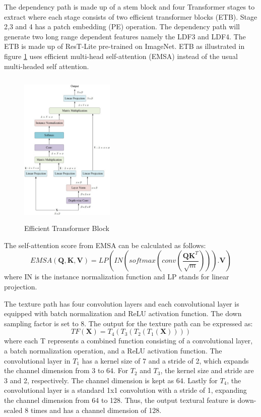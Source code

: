 The dependency path is made up of a stem block and four Transformer stages to extract where each stage consists of two efficient transformer blocks (ETB). Stage 2,3 and 4 has a patch embedding (PE) operation. The dependency path will generate two long range dependent features namely the LDF3 and LDF4. The ETB is made up of ResT-Lite \cite{restlite} pre-trained on ImageNet. ETB as illustrated in figure \ref{fig:etb} uses efficient multi-head self-attention (EMSA) instead of the usual multi-headed self attention.

\FloatBarrier
\begin{figure}[ht]
\includegraphics[width=4.5cm, height=7.5cm]{images/etb.png}
\centering
\caption{Efficient Transformer Block \protect\cite{banet}}
\label{fig:etb}
\end{figure}

The self-attention score from EMSA can be calculated as follows:
\begin{equation}
    EMSA(\mathbf{Q,K,V}) = LP(IN(softmax(conv(\frac{\mathbf{QK}^T}{\sqrt{m}}))).\mathbf{V})
\end{equation}
where IN is the instance normalization function and LP stands for linear projection.

The texture path has four convolution layers and each convolutional layer is equipped with batch normalization and ReLU activation function. The down sampling factor is set to 8. The output for the texture path can be expressed as:
\begin{equation}
    TF(\mathbf{X}) = T_4(T_3(T_2(T_1(\mathbf{X}))))
\end{equation}
where each T represents a combined function consisting of a convolutional layer, a batch
normalization operation, and a ReLU activation function. The convolutional layer in $T_1$ has a
kernel size of 7 and a stride of 2, which expands the channel dimension from 3 to 64. For
$T_2$ and $T_3$, the kernel size and stride are 3 and 2, respectively. The channel dimension is
kept as 64. Lastly for $T_4$, the convolutional layer is a standard 1x1 convolution with a stride of 1, expanding the channel dimension from 64 to 128. Thus, the output textural feature is
down-scaled 8 times and has a channel dimension of 128.

